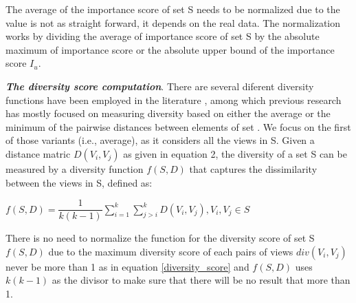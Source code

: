 {The average of the importance score of set S needs to be normalized due to the value is not as straight forward, it depends on the real data. The normalization works by dividing the average of importance score of set S by the absolute maximum of importance score or the absolute upper bound of the importance score $I_u$. 

\textbf{\textit{The diversity score computation}}. There are several diferent diversity functions have been employed in the literature \cite{Vieira2011, Clarke2008}, among which previous research has mostly focused on measuring diversity based on either the average or the minimum of the pairwise distances between elements of set \cite{Wu2014}. We focus on the first of those variants (i.e., average), as it considers all the views in S. Given a distance matric $ D\left(V_i, V_j\right) $ as given in equation 2, the diversity of a set S can be measured by a diversity function $ f\left(S,D\right) $ that captures the dissimilarity between the views in S, defined as:
\newline

$ f\left(S,D\right)= \dfrac{1}{k\left(k-1\right)}  \sum_{i=1}^{k} \sum_{j>i}^{k} D\left(V_i,V_j\right) ,V_i,V_j  \in S $
\newline

There is no need to normalize the function for the diversity score of set S $ f\left(S,D\right) $ due to the maximum diversity score of each pairs of views $div\left(V_i,V_j\right)$ never be more than 1 as in equation \ref{diversity_score} and $ f\left(S,D\right) $ uses $k\left(k-1\right)$ as the divisor to make sure that there will be no result that more than 1. 

}
